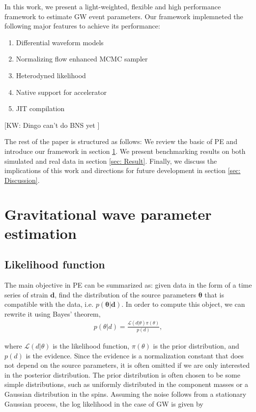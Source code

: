 \documentclass[twocolumn]{aastex631}
\newcommand{\kw}[1]{{\color{rb4}[KW: #1 ]}}
\begin{document}

In this work, we present a light-weighted, flexible and high performance
framework to estimate GW event parameters. Our framework implemneted the
following major features to achieve its performance:
\begin{enumerate}
\item Differential waveform models
\item Normalizing flow enhanced MCMC sampler
\item Heterodyned likelihood
\item Native support for accelerator
\item JIT compilation
\end{enumerate}
\kw{Dingo can't do BNS yet}


The rest of the paper is structured as follows: We review the basic of PE and
introduce our framework in section \ref{sec: PE}. We present benchmarking
results on both simulated and real data in section \ref{sec: Result}. Finally,
we discuss the implications of this work and directions for future development
in section \ref{sec: Discussion}.

\section{Gravitational wave parameter estimation}
\label{sec: PE}

\subsection{Likelihood function}
\label{sec:likelihood}

The main objective in PE can be summarized as: given data in the form of a time
series of strain $\mathbf{d}$, find the distribution of the source parameters
$\mathbf{\theta}$ that is compatible with the data, i.e.
$p(\mathbf{\theta}|\mathbf{d})$. In order to compute this object, we can rewrite
it using Bayes' theorem,
\begin{align}
    p(\theta| d) = \frac{\mathcal{L}(d|\theta)\pi(\theta)}{p(d)},
\end{align}

where $\mathcal{L}(d|\theta)$ is the likelihood function, $\pi(\theta)$ is the
prior distribution, and $p(d)$ is the evidence. Since the evidence is a
normalization constant that does not depend on the source parameters, it is
often omitted if we are only interested in the posterior distribution. The prior
distribution is often chosen to be some simple distributions, such as uniformly
distributed in the component masses or a Gaussian distribution in the spins.
Assuming the noise follows from a stationary Gaussian process, the log
likelihood in the case of GW is given by
\end{document}

